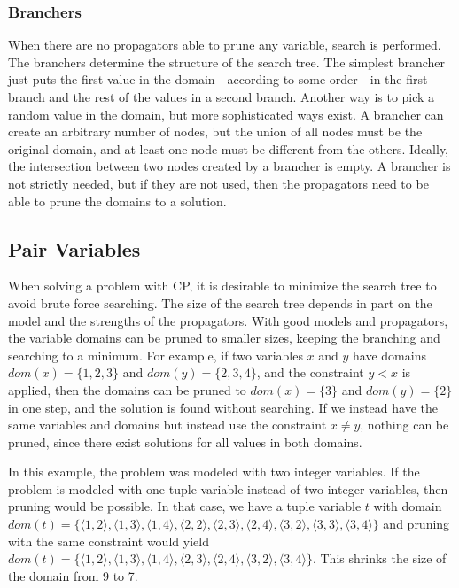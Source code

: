 \documentclass[a4paper,11pt]{article}
\begin{document}
\subsubsection{Branchers}
\label{sec:branchers}
When there are no propagators able to prune any variable, search is performed. The branchers determine the structure of the search tree. The simplest brancher just puts the first value in the domain - according to some order - in the first branch and the rest of the values in a second branch. Another way is to pick a random value in the domain, but more sophisticated ways exist. A brancher can create an arbitrary number of nodes, but the union of all nodes must be the original domain, and at least one node must be different from the others. Ideally, the intersection between two nodes created by a brancher is empty. A brancher is not strictly needed, but if they are not used, then the propagators need to be able to prune the domains to a solution.

\subsection{Pair Variables}
When solving a problem with CP, it is desirable to minimize the search tree to avoid brute force searching. The size of the search tree depends in part on the model and the strengths of the propagators. With good models and propagators, the variable domains can be pruned to smaller sizes, keeping the branching and searching to a minimum. For example, if two variables $x$ and $y$ have domains $dom(x)=\{1,2,3\}$ and $dom(y)=\{2,3,4\}$, and the constraint $y<x$ is applied, then the domains can be pruned to $dom(x)=\{3\}$ and $dom(y)=\{2\}$ in one step, and the solution is found without searching. If we instead have the same variables and domains but instead use the constraint $x\neq y$, nothing can be pruned, since there exist solutions for all values in both domains.

In this example, the problem was modeled with two integer variables. If the problem is modeled with one tuple variable instead of two integer variables, then pruning would be possible. In that case, we have a tuple variable $t$ with domain 
$dom(t)=\{
\langle1,2\rangle,\allowbreak 
\langle1,3\rangle,\allowbreak 
\langle1,4\rangle,\allowbreak
\langle2,2\rangle,\allowbreak
\langle2,3\rangle,\allowbreak
\langle2,4\rangle,\allowbreak
\langle3,2\rangle,\allowbreak
\langle3,3\rangle,\allowbreak
\langle3,4\rangle\}$ 
and pruning with the same constraint would yield 
$dom(t)=\{
\langle1,2\rangle,\allowbreak
\langle1,3\rangle,\allowbreak
\langle1,4\rangle,\allowbreak
\langle2,3\rangle,\allowbreak
\langle2,4\rangle,\allowbreak
\langle3,2\rangle,\allowbreak
\langle3,4\rangle\}$. 
This shrinks the size of the domain from 9 to 7. 
\end{document}
